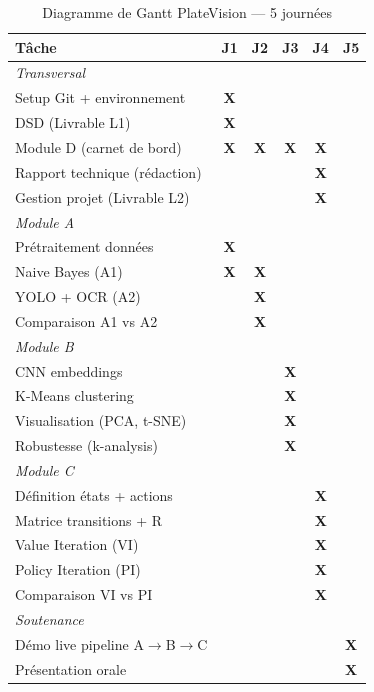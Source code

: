 \documentclass[12pt,a4paper]{article}
\begin{document}
\begin{table}[H]
\centering
\caption{Diagramme de Gantt PlateVision --- 5 journ\'{e}es}
\label{tab:gp:gantt}
\begin{tabular}{p{5cm}ccccc}
\toprule
\textbf{T\^{a}che} & \textbf{J1} & \textbf{J2} & \textbf{J3} & \textbf{J4} & \textbf{J5} \\
\midrule
\multicolumn{6}{l}{\textit{Transversal}} \\
\quad Setup Git + environnement  & \textbf{X} & & & & \\
\quad DSD (Livrable L1)          & \textbf{X} & & & & \\
\quad Module D (carnet de bord)  & \textbf{X} & \textbf{X} & \textbf{X} & \textbf{X} & \\
\quad Rapport technique (r\'{e}daction) & & & & \textbf{X} & \\
\quad Gestion projet (Livrable L2) & & & & \textbf{X} & \\
\midrule
\multicolumn{6}{l}{\textit{Module A}} \\
\quad Pr\'{e}traitement donn\'{e}es      & \textbf{X} & & & & \\
\quad Naive Bayes (A1)           & \textbf{X} & \textbf{X} & & & \\
\quad YOLO + OCR (A2)            & & \textbf{X} & & & \\
\quad Comparaison A1 vs A2       & & \textbf{X} & & & \\
\midrule
\multicolumn{6}{l}{\textit{Module B}} \\
\quad CNN embeddings             & & & \textbf{X} & & \\
\quad K-Means clustering         & & & \textbf{X} & & \\
\quad Visualisation (PCA, t-SNE) & & & \textbf{X} & & \\
\quad Robustesse (k-analysis)    & & & \textbf{X} & & \\
\midrule
\multicolumn{6}{l}{\textit{Module C}} \\
\quad D\'{e}finition \'{e}tats + actions & & & & \textbf{X} & \\
\quad Matrice transitions + R    & & & & \textbf{X} & \\
\quad Value Iteration (VI)       & & & & \textbf{X} & \\
\quad Policy Iteration (PI)      & & & & \textbf{X} & \\
\quad Comparaison VI vs PI       & & & & \textbf{X} & \\
\midrule
\multicolumn{6}{l}{\textit{Soutenance}} \\
\quad D\'{e}mo live pipeline A$\to$B$\to$C & & & & & \textbf{X} \\
\quad Pr\'{e}sentation orale      & & & & & \textbf{X} \\
\bottomrule
\end{tabular}
\end{table}
\end{document}

